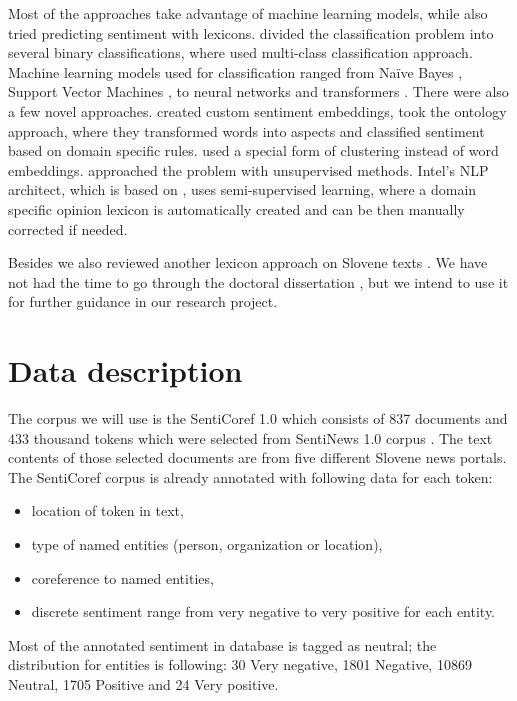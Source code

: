 \documentclass[11pt,a4paper]{article}
\begin{document}
Most of the approaches take advantage of machine learning models, while \cite{sweeney} also tried predicting sentiment with lexicons. \cite{biyani} divided the classification problem into several binary classifications, where \cite{ding} used multi-class classification approach. Machine learning models used for classification ranged from Naïve Bayes \cite{c_sentinews}, Support Vector Machines \cite{tang}, to neural networks \cite{jebbara} and transformers \cite{yang}.
There were also a few novel approaches. \cite{jebbara} created custom sentiment embeddings, \cite{wallaart} took the ontology approach, where they transformed words into aspects and classified sentiment based on domain specific rules. \cite{guha} used a special form of clustering instead of word embeddings. \cite{hercig} approached the problem with unsupervised methods. Intel's NLP architect, which is based on \cite{mamou}, uses semi-supervised learning, where a domain specific opinion lexicon is automatically created and can be then manually corrected if needed.

Besides \cite{c_sentinews} we also reviewed another lexicon approach on Slovene texts \cite{kadunc}. We have not had the time to go through the doctoral dissertation \cite{bucar_phd}, but we intend to use it for further guidance in our research project.


\section{Data description}

The corpus we will use is the SentiCoref 1.0 \cite{c_senticoref} which consists of 837 documents and 433 thousand tokens which were selected from SentiNews 1.0 corpus \cite{c_sentinews}. The text contents of those selected documents are from five different Slovene news portals. The SentiCoref corpus is already annotated with following data for each token:

\begin{itemize}
    \item location of token in text,
    \item type of named entities (person, organization or location),
    \item coreference to named entities,
    \item discrete sentiment range from very negative to very positive for each entity. 
\end{itemize}

Most of the annotated sentiment in database is tagged as neutral; the distribution for entities is following: 30 Very negative, 1801 Negative, 10869 Neutral, 1705 Positive and 24 Very positive.
\end{document}
